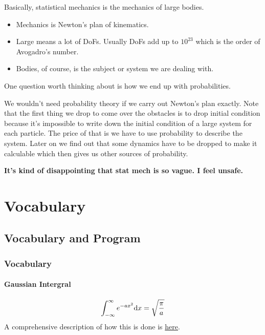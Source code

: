 \documentclass[letterpaper,10pt,english]{sphinxmanual}
\begin{document}
Basically, statistical mechanics is the mechanics of large bodies.
\begin{itemize}
\item {} 
Mechanics is Newton's plan of kinematics.

\item {} 
Large means a lot of DoFs. Usually DoFs add up to $10^{23}$ which is the order of Avogadro's number.

\item {} 
Bodies, of course, is the subject or system we are dealing with.

\end{itemize}

One question worth thinking about is how we end up with probabilities.

We wouldn't need probability theory if we carry out Newton's plan exactly. Note that the first thing we drop to come over the obstacles is to drop initial condition because it's impossible to write down the initial condition of a large system for each particle. The price of that is we have to use probability to describe the system. Later on we find out that some dynamics have to be dropped to make it calculable which then gives us other sources of probability.

\textbf{It's kind of disappointing that stat mech is so vague. I feel unsafe.}


\chapter{Vocabulary}
\label{index:vocabulary}

\section{Vocabulary and Program}
\label{vocabulary/main:vocabulary-and-program}\label{vocabulary/main::doc}

\subsection{Vocabulary}
\label{vocabulary/vocabulary:index-0}\label{vocabulary/vocabulary::doc}\label{vocabulary/vocabulary:vocabulary}

\subsubsection{Gaussian Intergral}
\label{vocabulary/vocabulary:index-1}\label{vocabulary/vocabulary:gaussian-intergral}\begin{gather}
\begin{split}\int_{-\infty}^{\infty} e^{-ax^2} \mathrm dx = \sqrt{\frac{\pi}{a}}\end{split}\notag
\end{gather}
A comprehensive description of how this is done is \href{http://mathworld.wolfram.com/GaussianIntegral.html}{here}.
\end{document}
